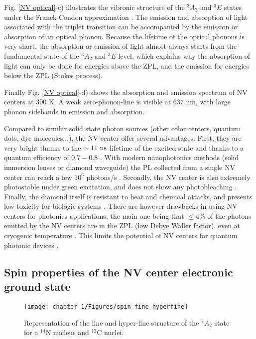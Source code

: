 \documentclass[a4paper, 11pt]{report}
\begin{document}
Fig. \ref{NV optical}-c) illustrates the vibronic structure of the $^3A_2$ and $^3E$ states under the Franck-Condon approximation \citep{gali2011time}. The emission and absorption of light associated with the triplet transition can be accompanied by the emission or absorption of an optical phonon. Because the lifetime of the optical phonons is very short, the absorption or emission of light almost always starts from the fundamental state of the $^3A_2$ and $^3E$ level, which explains why the absorption of light can only be done for energies above the ZPL, and the emission for energies below the ZPL (Stokes process).

Finally Fig. \ref{NV optical}-d) shows the absorption and emission spectrum of NV centers at 300 K. A weak zero-phonon-line is visible at 637 nm, with large phonon sidebands in emission and absorption.

\medskip
Compared to similar solid state photon sources (other color centers, quantum dots, dye molecules...), the NV center offer several advantages. First, they are very bright thanks to the $\sim 11\ \rm ns$ lifetime of the excited state and thanks to a quantum efficiency of $0.7-0.8$ \citep{schirhagl2014nitrogen}. With modern nanophotonics methods (solid immersion lenses or diamond waveguide) the PL collected from a single NV center can reach a few $10^6$ photons/s \citep{schroder2016quantum}. Secondly, the NV center is also extremely photostable under green excitation, and does not show any photobleaching \citep{brouri2000photon}. Finally, the diamond itself is resistant to heat and chemical attacks, and presents low toxicity for biologic systems \citep{fu2007characterization}. There are however drawbacks in using NV centers for photonics applications, the main one being that $\leq 4\%$ of the photons emitted by the NV centers are in the ZPL (low Debye Waller factor), even at cryogenic temperature \citep{johnson2015tunable}. This limits the potential of NV centers for quantum photonic devices \citep{bradac2019quantum}.

\subsection{Spin properties of the NV center electronic ground state}
\begin{figure}[h!]
\centering
\texttt{[image: chapter 1/Figures/spin\_fine\_hyperfine]}
\caption{Representation of the fine and hyper-fine structure of the $^3A_2$ state for a $^{14}$N nucleus and $^{12}$C nuclei.}
\label{NV spin}
\end{figure}
\end{document}
